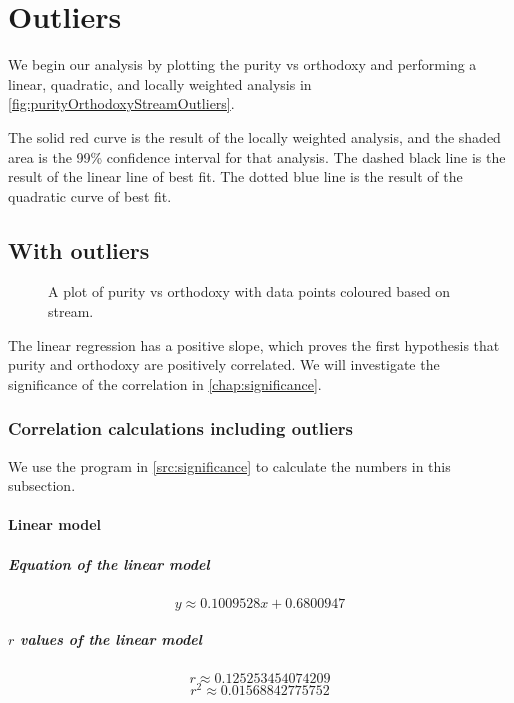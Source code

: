 \chapter{Outliers}\label{chap:outliers}

We begin our analysis by plotting the purity vs orthodoxy and performing a linear, quadratic, and locally weighted analysis in \vref{fig:purityOrthodoxyStreamOutliers}.

The solid red curve is the result of the locally weighted analysis, and the shaded area is the 99\% confidence interval for that analysis.
The dashed black line is the result of the linear line of best fit.
The dotted blue line is the result of the quadratic curve of best fit.

\section{With outliers}
\begin{figure}[H]
	\caption{A plot of purity vs orthodoxy with data points coloured based on stream.}
	\label{fig:purityOrthodoxyStreamOutliers}
\end{figure}

The linear regression has a positive slope, which proves the first hypothesis that purity and orthodoxy are positively correlated.
We will investigate the significance of the correlation in \vref{chap:significance}.

\subsection{Correlation calculations including outliers}
We use the program in \vref{src:significance} to calculate the numbers in this subsection.

\subsubsection{Linear model}
\paragraph{Equation of the linear model}
\[y \approx \num{0.1009528}x + \num{0.6800947}\]
\paragraph{$r$ values of the linear model}
\[r \approx \num{0.125253454074209}\]
\[r^2 \approx \num{0.01568842775752}\]

